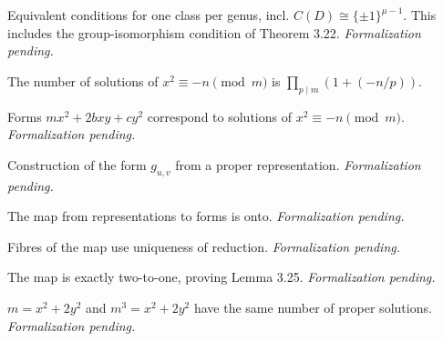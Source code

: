 \begin{theorem}[Exercise 3.19]
  \label{exr:s3_19}
  \notready
  Equivalent conditions for one class per genus, incl. $C(D)\cong\{\pm1\}^{\mu-1}$.
  This includes the group-isomorphism condition of Theorem 3.22.
  \emph{Formalization pending.}
\end{theorem}

\begin{theorem}[Exercise 3.20(a)]
  \label{exr:s3_20_a}
  \leanok
  The number of solutions of $x^2\equiv-n \pmod m$ is $\prod_{p\mid m}(1+(-n/p))$.
\end{theorem}

\begin{theorem}[Exercise 3.20(b)]
  \label{exr:s3_20_b}
  \notready
  Forms $mx^2+2bxy+cy^2$ correspond to solutions of $x^2\equiv-n \pmod m$.
  \emph{Formalization pending.}
\end{theorem}

\begin{theorem}[Exercise 3.20(c)]
  \label{exr:s3_20_c}
  \notready
  Construction of the form $g_{u,v}$ from a proper representation. \emph{Formalization pending.}
\end{theorem}

\begin{theorem}[Exercise 3.20(d)]
  \label{exr:s3_20_d}
  \notready
  The map from representations to forms is onto. \emph{Formalization pending.}
\end{theorem}

\begin{theorem}[Exercise 3.20(e)]
  \label{exr:s3_20_e}
  \notready
  Fibres of the map use uniqueness of reduction. \emph{Formalization pending.}
\end{theorem}

\begin{theorem}[Exercise 3.20(f)]
  \label{exr:s3_20_f}
  \notready
  The map is exactly two-to-one, proving Lemma 3.25. \emph{Formalization pending.}
\end{theorem}

\begin{theorem}[Exercise 3.21(a)]
  \label{exr:s3_21_a}
  \notready
  $m=x^2+2y^2$ and $m^3=x^2+2y^2$ have the same number of proper solutions.
  \emph{Formalization pending.}
\end{theorem}

